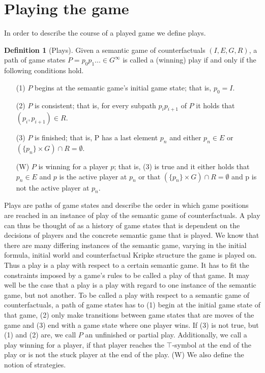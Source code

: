 \documentclass[a4paper,american,10pt]{paper}
\theoremstyle{definition}\newtheorem{definition}{Definition}
\begin{document}
\section{Playing the game}
In order to describe the course of a played game we define plays.
\begin{definition}[Plays]
Given a semantic game of counterfactuals $(I, E, G, R)$, a path of game states $P=p_0p_1...\in G^{\infty}$ is called a (winning) play if and only if the following conditions hold.
\begin{itemize}
	\item[(1)] $P$ begins at the semantic game's initial game state; that is, $p_0=I$.
	\item[(2)] $P$ is consistent; that is, for every subpath $p_ip_{i+1}$ of $P$ it holds that $(p_{i},p_{i+1})\in R$.
	\item[(3)] $P$ is finished; that is, P has a last element $p_n$ and either $p_n\in E$ or $(\{p_n\}\times G)\cap R = \emptyset$.
	\item[(W)] $P$ is winning for a player $p$; that is, (3) is true and it either holds that $p_n\in E$ and $p$ is the active player at $p_n$ or that $(\{p_n\}\times G)\cap R = \emptyset$ and p is not the active player at $p_n$.
\end{itemize}
\end{definition}
Plays are paths of game states and describe the order in which game positions are reached in an instance of play of the semantic game of counterfactuals. A play can thus be thought of as a history of game states that is dependent on the decisions of players and the concrete semantic game that is played. We know that there are many differing instances of the semantic game, varying in the initial formula, initial world and counterfactual Kripke structure the game is played on. Thus a play is a play with respect to a certain semantic game. It has to fit the constraints imposed by a game's rules to be called a play of that game. It may well be the case that a play is a play with regard to one instance of the semantic game, but not another. To be called a play with respect to a semantic game of counterfactuals, a path of game states has to (1) begin at the initial game state of that game, (2) only make transitions between game states that are moves of the game and (3) end with a game state where one player wins. If (3) is not true, but (1) and (2) are, we call $P$ an unfinished or partial play. Additionally, we call a play winning for a player, if that player reaches the $\top$-symbol at the end of the play or is not the stuck player at the end of the play. (W) We also define the notion of strategies.
\end{document}
